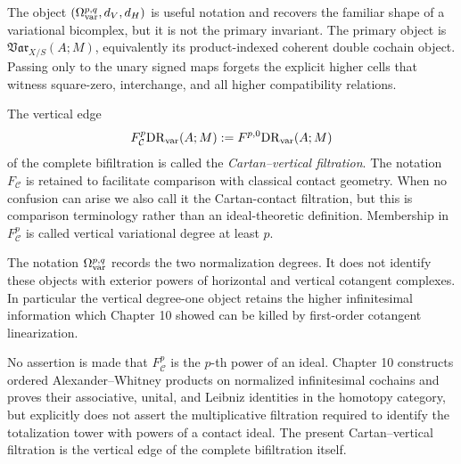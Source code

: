 \begin{remark}
\label{rem:var-bicomplex-shadow}
The object \((\Omega_{\mathrm{var}}^{p,q},d_V,d_H)\) is useful notation and recovers the familiar shape of a variational bicomplex, but it is not the primary invariant. The primary object is \(\mathfrak{Var}_{X/S}(A;M)\), equivalently its product-indexed coherent double cochain object. Passing only to the unary signed maps forgets the explicit higher cells that witness square-zero, interchange, and all higher compatibility relations.
\end{remark}

\begin{definition}
\label{def:var-contact-filtration}
The vertical edge
\[
    F_{\mathcal C}^p\mathrm{DR}_{\mathrm{var}}(A;M)
    :=
    F^{p,0}\mathrm{DR}_{\mathrm{var}}(A;M)
\]
of the complete bifiltration is called the \emph{Cartan--vertical filtration}. The notation \(F_{\mathcal C}\) is retained to facilitate comparison with classical contact geometry. When no confusion can arise we also call it the Cartan-contact filtration, but this is comparison terminology rather than an ideal-theoretic definition. Membership in \(F_{\mathcal C}^p\) is called vertical variational degree at least \(p\).
\end{definition}

\begin{remark}
\label{rem:var-no-exterior}
The notation \(\Omega_{\mathrm{var}}^{p,q}\) records the two normalization degrees. It does not identify these objects with exterior powers of horizontal and vertical cotangent complexes. In particular the vertical degree-one object retains the higher infinitesimal information which Chapter 10 showed can be killed by first-order cotangent linearization.
\end{remark}

\begin{remark}
\label{rem:var-contact-not-ideal}
No assertion is made that \(F_{\mathcal C}^p\) is the \(p\)-th power of an ideal. Chapter 10 constructs ordered Alexander--Whitney products on normalized infinitesimal cochains and proves their associative, unital, and Leibniz identities in the homotopy category, but explicitly does not assert the multiplicative filtration required to identify the totalization tower with powers of a contact ideal. The present Cartan--vertical filtration is the vertical edge of the complete bifiltration itself.
\end{remark}

